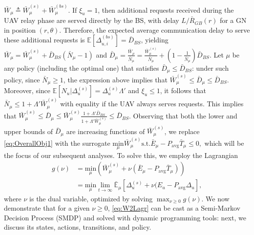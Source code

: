 \documentclass[10pt, twocolumn]{IEEEtran}
\theoremstyle{plain}
\theoremstyle{definition}
\theoremstyle{remark}
\begin{document}
 $\bar{W}_{\mu}{\triangleq}\bar{W}_{\mu}^{(s)}{+}\bar{W}_{\mu}^{(bs)}$. If $\xi_u{=}1$, then additional requests received during the UAV relay phase are served directly by the BS, with delay $L/\bar{R}_{GB}(r)$ for a GN in position $(r,\theta)$. Therefore, the expected average communication delay to serve these additional requests is $\mathbb E[\Delta_{u,i}^{(bs)}]{=}\bar{D}_{BS}$, yielding $\bar{W}_{\mu}{=}\bar{W}_{\mu}^{(s)}{+}\bar{D}_{BS}(\bar{N}_{\mu}{-}1)$ and
 $\bar{D}_{\mu}{=}\frac{\bar{W}_{\mu}}{\bar{N}_{\mu}}{=}\frac{\bar{W}_{\mu}^{(s)}}{\bar{N}_{\mu}}{+}\left(1{-}\frac{1}{\bar N_{\mu}}\right)\bar{D}_{BS}$. 
 Let $\mu$ be any policy (including the optimal one) that satisfies $\bar{D}_{\mu}{\leq}\bar{D}_{BS}$: under such policy, since $\bar{N}_{\mu}{\geq}1$, the expression above implies that $\bar{W}_{\mu}^{(s)}{\leq}\bar{D}_{\mu}{\leq}\bar{D}_{BS}$. 
Moreover, since
$\mathbb{E}[N_{u}|\Delta_{u}^{(s)}]{=}\Delta_{u}^{(s)}\Lambda'$ and $\xi_{u}{\leq}1$, it follows that $\bar{N}_{\mu}{\leq}1{+}\Lambda'\bar{W}_{\mu}^{(s)}$
with  equality if the UAV always serves requests. 
This implies that $\bar{W}_{\mu}^{(s)}{\leq}\bar{D}_{\mu}{\leq}\bar{W}_{\mu}^{(s)}\frac{1{+}\Lambda'\bar{D}_{BS}}{1{+}\Lambda'\bar{W}_{\mu}^{(s)}}{\leq}\bar{D}_{BS}$. 
Observing that both the lower and upper bounds of $\bar{D}_{\mu}$ are increasing functions of $\bar{W}_{\mu}^{(s)}$, we
replace \eqref{eq:OverallObj1} with the surrogate 
 $\underset{\mu}{\mathrm{min}}\bar{W}_{\mu}^{(s)}\mathrm{ s.t. }\bar{E}_{\mu}{-}P_{\mathrm{avg}}\bar{T}_{\mu}{\leq}0,$ which will be the focus of our subsequent analyses. To solve this, we employ the Lagrangian
\begin{align}\label{eq:W2Lagr}
    g(\nu)&{=}\underset{\mu}{\mathrm{min}}\left(\bar{W}_{\mu}^{(s)}{+}\nu(\bar{E}_{\mu}{-}P_{\mathrm{avg}}\bar{T}_{\mu})\right)\nonumber\\
    &{=}\underset{\mu}{\mathrm{min}}\lim_{t{\rightarrow}\infty}\bar{\mathbb{E}}_{\mu}\left[\Delta_{u}^{(s)}{+}\nu(E_{u}{-}P_{\mathrm{avg}}\Delta_{u}\right],
\end{align}
where $\nu$ is the dual variable, optimized by solving $\max_{\nu{\geq}0}g(\nu)$. We now demonstrate that for a given $\nu{\geq}0$, \eqref{eq:W2Lagr} can be cast as a Semi-Markov Decision Process (SMDP) and solved with dynamic programming tools: next, we discuss its states, actions, transitions, and policy.\\
\end{document}
